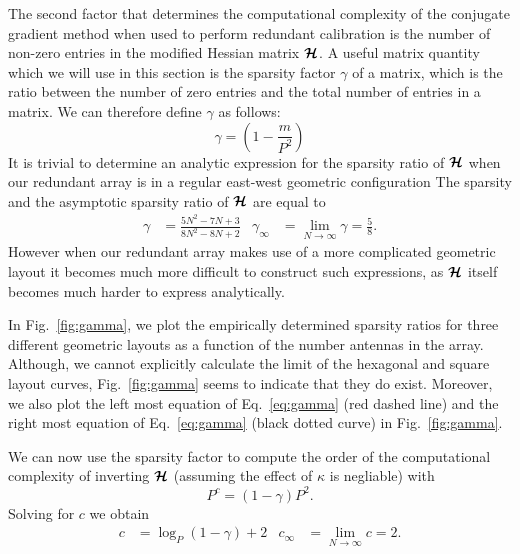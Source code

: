 \documentclass[useAMS,usenatbib]{mn2e}
\newcommand{\bH}{\bmath{H}}
\newcommand{\bmH}{\bmath{\mathcal{H}}}
\begin{document}
The second factor that determines the computational complexity of the conjugate gradient method when used to perform redundant calibration is the number of non-zero
entries in the modified Hessian matrix $\bmH$. 
A useful matrix quantity which we will use in this section is the sparsity factor $\gamma$ of a matrix, which is the ratio between the number of zero entries and the total number of entries in a matrix. We 
can therefore define $\gamma$ as follows:
\begin{equation}
 \gamma = \left (1 - \frac{m}{P^2} \right ) 
\end{equation}
It is trivial to determine an analytic expression for the sparsity ratio of $\bmH$ when our redundant array is in a regular east-west geometric configuration
The sparsity and the asymptotic sparsity ratio of $\bmH$ are equal to
\begin{align}
\gamma &= \frac{5N^2-7N+3}{8N^2-8N+2} & \gamma_{\infty} &= \lim_{N\rightarrow \infty}\gamma = \frac{5}{8} \label{eq:gamma}. 
\end{align}
However when our redundant array makes use of a more complicated geometric layout it becomes much more difficult to construct such expressions, as $\bmH$ itself 
becomes much harder to express analytically. 

In Fig.~\ref{fig:gamma}, we plot the empirically determined sparsity ratios for three different geometric layouts as a function of the number antennas in the array. Although, we cannot explicitly calculate 
the limit of the hexagonal and square layout curves, Fig.~\ref{fig:gamma} seems to indicate that they do exist. Moreover, we also plot the left most equation
of Eq.~\eqref{eq:gamma} (red dashed line) and the right most equation of Eq.~\eqref{eq:gamma} (black dotted curve) in Fig.~\ref{fig:gamma}.  

We can now use the sparsity factor to compute the order of the computational complexity of inverting $\bmH$ (assuming the effect of $\kappa$ is negliable) with
\begin{equation}
P^{c} = (1 - \gamma)P^2.
\end{equation}
Solving for $c$ we obtain
\begin{align}
c &= \log_{P}(1 - \gamma) + 2 & c_{\infty} &= \lim_{N\rightarrow \infty} c = 2. \label{eq:c}
\end{align}
\end{document}
